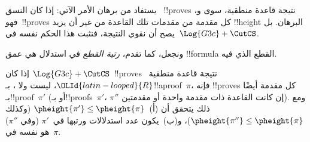 \documentclass[../../../include/open-logic-section]{subfiles}
\begin{document}


يستفاد من برهان  الأمر الآتي: إذا كان
النسق ~!!{prove}s نتيجة قاعدة منطقية، سوى
\RightR{\lexists} و\LeftR{\lforall}، فهو~!!{prove}s كل مقدمة من مقدمات
تلك القاعدة من غير أن يزيد !!{height} البرهان. بل يصح أن نقوي النتيجة،
فنثبت هذا الحكم نفسه في~$\Log{G3c} + \CutCS$.

ونجعل، كما تقدم، \emph{رتبة القطع} في استدلال \CutCS{} هي عمق
!!{formula} القطع الذي فيه.

\begin{lem}
إذا كان $\Log{G3c} + \CutCS$~!!{prove}s نتيجة قاعدة منطقية~$\OLId{latin-looped}{R}$، ليست
\RightR{\lexists} ولا \LeftR{\lforall}، بـ!!a{proof}~$\pi$، فإنه
!!{prove}s كل مقدمة أيضًا بـ!!{proof}~$\pi'$ (أو بـ!!{proof}s~$\pi'$،
$\pi''$ إن كانت القاعدة ذات مقدمة واحدة أو مقدمتين). ومع ذلك يتحقق أن
(أ)~$\pheight{\pi'}\le\pheight{\pi}$ (وكذلك
$\pheight{\pi''}\le\pheight{\pi}$)، و(ب)~يكون عدد استدلالات \CutCS{}
ورتبها في~$\pi'$ (وفي $\pi''$) هو نفسه في~$\pi$.
\end{lem}
\end{document}
